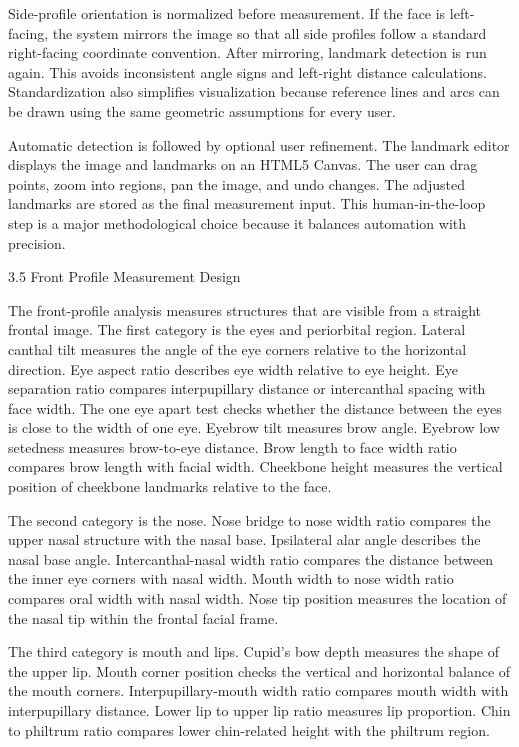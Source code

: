 Side-profile orientation is normalized before measurement. If the face is left-facing, the system mirrors the image so that all side profiles follow a standard right-facing coordinate convention. After mirroring, landmark detection is run again. This avoids inconsistent angle signs and left-right distance calculations. Standardization also simplifies visualization because reference lines and arcs can be drawn using the same geometric assumptions for every user.

Automatic detection is followed by optional user refinement. The landmark editor displays the image and landmarks on an HTML5 Canvas. The user can drag points, zoom into regions, pan the image, and undo changes. The adjusted landmarks are stored as the final measurement input. This human-in-the-loop step is a major methodological choice because it balances automation with precision.

3.5  Front Profile Measurement Design

The front-profile analysis measures structures that are visible from a straight frontal image. The first category is the eyes and periorbital region. Lateral canthal tilt measures the angle of the eye corners relative to the horizontal direction. Eye aspect ratio describes eye width relative to eye height. Eye separation ratio compares interpupillary distance or intercanthal spacing with face width. The one eye apart test checks whether the distance between the eyes is close to the width of one eye. Eyebrow tilt measures brow angle. Eyebrow low setedness measures brow-to-eye distance. Brow length to face width ratio compares brow length with facial width. Cheekbone height measures the vertical position of cheekbone landmarks relative to the face.

The second category is the nose. Nose bridge to nose width ratio compares the upper nasal structure with the nasal base. Ipsilateral alar angle describes the nasal base angle. Intercanthal-nasal width ratio compares the distance between the inner eye corners with nasal width. Mouth width to nose width ratio compares oral width with nasal width. Nose tip position measures the location of the nasal tip within the frontal facial frame.

The third category is mouth and lips. Cupid's bow depth measures the shape of the upper lip. Mouth corner position checks the vertical and horizontal balance of the mouth corners. Interpupillary-mouth width ratio compares mouth width with interpupillary distance. Lower lip to upper lip ratio measures lip proportion. Chin to philtrum ratio compares lower chin-related height with the philtrum region.

